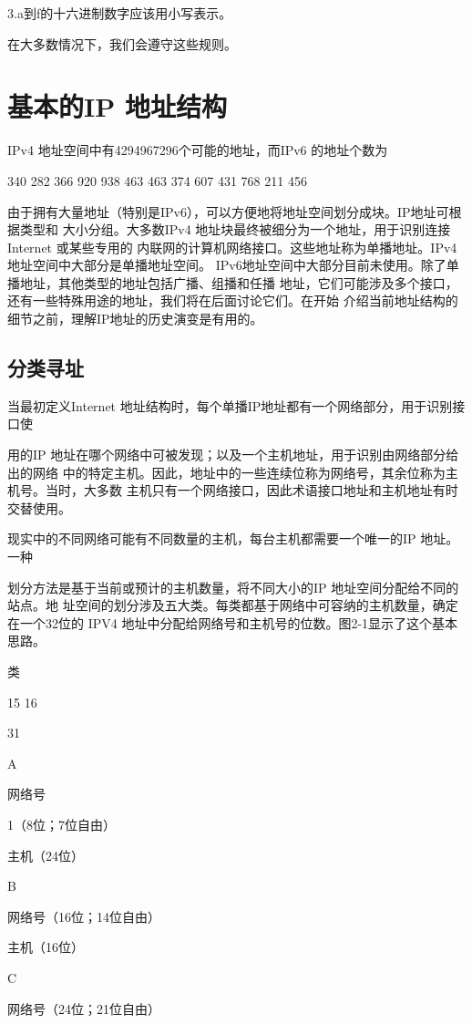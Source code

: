 3.a到f的十六进制数字应该用小写表示。

在大多数情况下，我们会遵守这些规则。

\section{基本的IP 地址结构}
IPv4 地址空间中有4294967296个可能的地址，而IPv6 的地址个数为

340 282 366 920 938 463 463 374 607 431 768 211 456

由于拥有大量地址（特别是IPv6），可以方便地将地址空间划分成块。IP地址可根据类型和
大小分组。大多数IPv4 地址块最终被细分为一个地址，用于识别连接 Internet 或某些专用的
内联网的计算机网络接口。这些地址称为单播地址。IPv4地址空间中大部分是单播地址空间。
IPv6地址空间中大部分目前未使用。除了单播地址，其他类型的地址包括广播、组播和任播
地址，它们可能涉及多个接口，还有一些特殊用途的地址，我们将在后面讨论它们。在开始
介绍当前地址结构的细节之前，理解IP地址的历史演变是有用的。

\subsection{分类寻址}
当最初定义Internet 地址结构时，每个单播IP地址都有一个网络部分，用于识别接口使

用的IP 地址在哪个网络中可被发现；以及一个主机地址，用于识别由网络部分给出的网络
中的特定主机。因此，地址中的一些连续位称为网络号，其余位称为主机号。当时，大多数
主机只有一个网络接口，因此术语接口地址和主机地址有时交替使用。

现实中的不同网络可能有不同数量的主机，每台主机都需要一个唯一的IP 地址。一种

划分方法是基于当前或预计的主机数量，将不同大小的IP 地址空间分配给不同的站点。地
址空间的划分涉及五大类。每类都基于网络中可容纳的主机数量，确定在一个32位的 IPV4
地址中分配给网络号和主机号的位数。图2-1显示了这个基本思路。

类

15 16

31

A

网络号

1（8位；7位自由）

主机（24位）

B

网络号（16位；14位自由）

主机（16位）

C

网络号（24位；21位自由）

